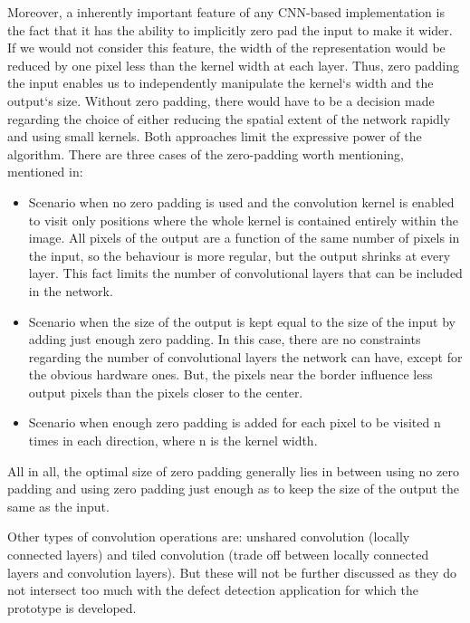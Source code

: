 \documentclass[12pt,a4paper,twoside]{report}
\begin{document}
Moreover, a inherently important feature of any CNN-based implementation is the fact that it has the ability to implicitly zero pad the input to make it wider. If we would not consider this feature, the width of the representation would be reduced by one pixel less than the kernel width at each layer. Thus, zero padding the input enables us to independently manipulate the kernel`s width and the output`s size. Without zero padding, there would have to be a decision made regarding the choice of either reducing the spatial extent of the network rapidly and using small kernels. Both approaches limit the expressive power of the algorithm. There are three cases of the zero-padding worth mentioning, mentioned in\cite{book-deeplearning}:
\begin{itemize}
    \item Scenario when no zero padding is used and the convolution kernel is enabled to visit only positions where the whole kernel is contained entirely within the image. All pixels of the output are a function of the same number of pixels in the input, so the behaviour is more regular, but the output shrinks at every layer. This fact limits the number of convolutional layers that can be included in the network.
    \item Scenario when the size of the output is kept equal to the size of the input by adding just enough zero padding. In this case, there are no constraints regarding the number of convolutional layers the network can have, except for the obvious hardware ones. But, the pixels near the border influence less output pixels than the pixels closer to the center. 
    \item Scenario when enough zero padding is added for each pixel to be visited n times in each direction, where n is the kernel width.
\end{itemize}
All in all, the optimal size of zero padding generally lies in between using no zero padding and using zero padding just enough as to keep the size of the output the same as the input.\par


Other types of convolution operations are: unshared convolution (locally connected layers) and tiled convolution (trade off between locally connected layers and convolution layers). But these will not be further discussed as they do not intersect too much with the defect detection application for which the prototype is developed.
\end{document}
